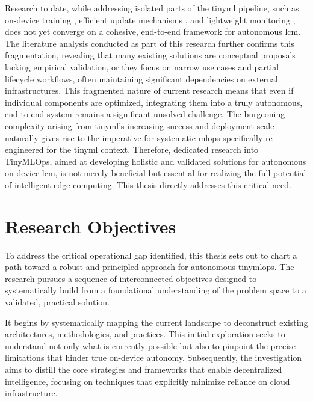 Research to date, while addressing isolated parts of the \gls{tinyml} pipeline, such as on-device training \cite{renOndeviceOnlineLearning2024, disabatoIncrementalOnDeviceTiny2020} , efficient update mechanisms \cite{sudharsanOTATinyMLAirDeployment2022, huangRIOTMLToolkitOvertheair2024a} , and lightweight monitoring \cite{antoniniTinyMLOpsFrameworkOrchestrating2022, minSensiXBringingMLOps2023} , does not yet converge on a cohesive, end-to-end framework for autonomous \gls{lcm}. The literature analysis conducted as part of this research further confirms this fragmentation, revealing that many existing solutions are conceptual proposals lacking empirical validation, or they focus on narrow use cases and partial lifecycle workflows, often maintaining significant dependencies on external infrastructures. This fragmented nature of current research means that even if individual components are optimized, integrating them into a truly autonomous, end-to-end system remains a significant unsolved challenge. The burgeoning complexity arising from \gls{tinyml}'s increasing success and deployment scale naturally gives rise to the imperative for systematic \gls{mlops} specifically re-engineered for the \gls{tinyml} context. Therefore, dedicated research into TinyMLOps, aimed at developing holistic and validated solutions for autonomous on-device \gls{lcm}, is not merely beneficial but essential for realizing the full potential of intelligent edge computing. This thesis directly addresses this critical need. 

\section{Research Objectives}
\label{sec:objective}

To address the critical operational gap identified, this thesis sets out to chart a path toward a robust and principled approach for autonomous \gls{tinymlops}. The research pursues a sequence of interconnected objectives designed to systematically build from a foundational understanding of the problem space to a validated, practical solution.

It begins by systematically mapping the current landscape to deconstruct existing architectures, methodologies, and practices. This initial exploration seeks to understand not only what is currently possible but also to pinpoint the precise limitations that hinder true on-device autonomy. Subsequently, the investigation aims to distill the core strategies and frameworks that enable decentralized intelligence, focusing on techniques that explicitly minimize reliance on cloud infrastructure.


